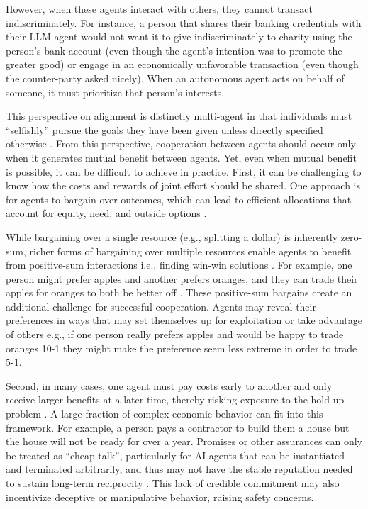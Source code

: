\documentclass{article} %
\begin{document}
However, when these agents interact with others, they cannot transact indiscriminately. For instance, a person that shares their banking credentials with their LLM-agent would not want it to give indiscriminately to charity using the person's bank account (even though the agent's intention was to promote the greater good) or engage in an economically unfavorable transaction (even though the counter-party asked nicely). When an autonomous agent acts on behalf of someone, it must prioritize that person's interests.

This perspective on alignment is distinctly multi-agent in that individuals must ``selfishly'' pursue the goals they have been given unless directly specified otherwise \citep{hammond2025multi}. From this perspective, cooperation between agents should occur only when it generates mutual benefit between agents. Yet, even when mutual benefit is possible, it can be difficult to achieve in practice. First, it can be challenging to know how the costs and rewards of joint effort should be shared. One approach is for agents to bargain over outcomes, which can lead to efficient allocations that account for equity, need, and outside options \citep{binmore2005natural, kleiman2017constructing, levine2024rules}. 

While bargaining over a single resource (e.g., splitting a dollar) is inherently zero-sum, richer forms of bargaining over multiple resources enable agents to benefit from positive-sum interactions i.e., finding win-win solutions \citep{schmid2020multi}. For example, one person might prefer apples and another prefers oranges, and they can trade their apples for oranges to both be better off \citep{brams1996fair}. These positive-sum bargains create an additional challenge for successful cooperation. Agents may reveal their preferences in ways that may set themselves up for exploitation or take advantage of others e.g., if one person really prefers apples and would be happy to trade oranges 10-1 they might make the preference seem less extreme in order to trade 5-1. 

Second, in many cases, one agent must pay costs early to another and only receive larger benefits at a later time, thereby risking exposure to the hold-up problem \citep{rogerson1992contractual}. A large fraction of complex economic behavior can fit into this framework. For example, a person pays a contractor to build them a house but the house will not be ready for over a year. Promises or other assurances can only be treated as ``cheap talk'', particularly for AI agents that can be instantiated and terminated arbitrarily, and thus may not have the stable reputation needed to sustain long-term reciprocity \citep{nowak2005evolution, rand2013human, kleiman2025evolving}. This lack of credible commitment may also incentivize deceptive or manipulative behavior, raising safety concerns.
\end{document}
